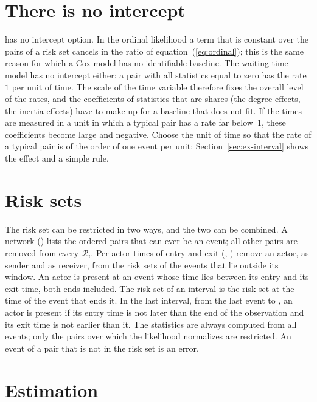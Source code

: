 \section{There is no intercept}\label{sec:nointercept}

\nwrem{} has no intercept option. In the ordinal likelihood a term that is constant over the pairs of a risk set cancels in the ratio of equation~(\ref{eq:ordinal}); this is the same reason for which a Cox model has no identifiable baseline. The waiting-time model has no intercept either: a pair with all statistics equal to zero has the rate $1$ per unit of time. The scale of the time variable therefore fixes the overall level of the rates, and the coefficients of statistics that are shares (the degree effects, the inertia effects) have to make up for a baseline that does not fit. If the times are measured in a unit in which a typical pair has a rate far below~1, these coefficients become large and negative. Choose the unit of time so that the rate of a typical pair is of the order of one event per unit; Section~\ref{sec:ex-interval} shows the effect and a simple rule.

\section{Risk sets}\label{sec:riskset-model}

The risk set can be restricted in two ways, and the two can be combined. A network () lists the ordered pairs that can ever be an event; all other pairs are removed from every $\mathcal R_i$. Per-actor times of entry and exit (, ) remove an actor, as sender and as receiver, from the risk sets of the events that lie outside its window. An actor is present at an event whose time lies between its entry and its exit time, both ends included. The risk set of an interval is the risk set at the time of the event that ends it. In the last interval, from the last event to , an actor is present if its entry time is not later than the end of the observation and its exit time is not earlier than it. The statistics are always computed from all events; only the pairs over which the likelihood normalizes are restricted. An event of a pair that is not in the risk set is an error.

\section{Estimation}\label{sec:estimation}

